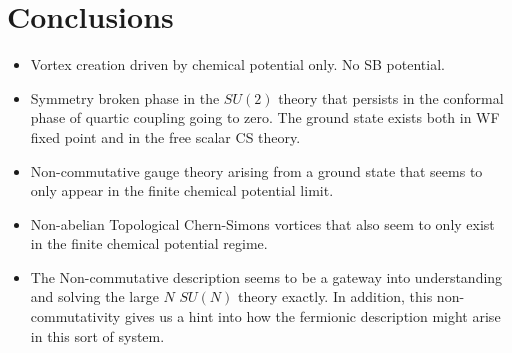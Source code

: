 
\chapter*{Conclusions}

\begin{itemize}
    \item Vortex creation driven by chemical potential only. No SB potential.
    \item Symmetry broken phase in the $SU(2)$ theory that persists in the conformal phase of quartic coupling going to zero. The ground state exists both in WF fixed point and in the free scalar CS theory.
    \item Non-commutative gauge theory arising from a ground state that seems to only appear in the finite chemical potential limit.
    \item Non-abelian Topological Chern-Simons vortices that also seem to only exist in the finite chemical potential regime.
    \item The Non-commutative description seems to be a gateway into understanding and solving the large $N$ $SU(N)$ theory exactly. In addition, this non-commutativity gives us a hint into how the fermionic description might arise in this sort of system.
\end{itemize}
